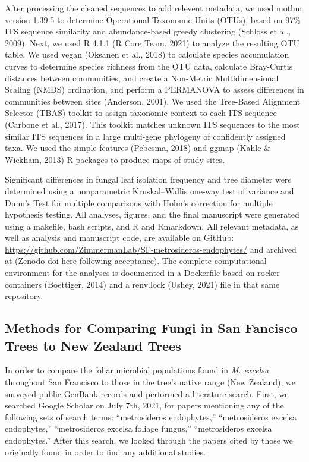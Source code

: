 \documentclass[fleqn,10pt,lineno]{wlpeerj} %
\begin{document}
After processing the cleaned sequences to add relevent metadata, we used mothur version 1.39.5 to determine Operational Taxonomic Units (OTUs), based on 97\% ITS sequence similarity and abundance-based greedy clustering (Schloss et al., 2009). Next, we used R 4.1.1 (R Core Team, 2021) to analyze the resulting OTU table. We used vegan (Oksanen et al., 2018) to calculate species accumulation curves to determine species richness from the OTU data, calculate Bray-Curtis distances between communities, and create a Non-Metric Multidimensional Scaling (NMDS) ordination, and perform a PERMANOVA to assess differences in communities between sites (Anderson, 2001). We used the Tree-Based Alignment Selector (TBAS) toolkit to assign taxonomic context to each ITS sequence (Carbone et al., 2017). This toolkit matches unknown ITS sequences to the most similar ITS sequences in a large multi-gene phylogeny of confidently assigned taxa. We used the simple features (Pebesma, 2018) and ggmap (Kahle \& Wickham, 2013) R packages to produce maps of study sites.

Significant differences in fungal leaf isolation frequency and tree diameter were determined using a nonparametric Kruskal--Wallis one-way test of variance and Dunn's Test for multiple comparisons with Holm's correction for multiple hypothesis testing. All analyses, figures, and the final manuscript were generated using a makefile, bash scripts, and R and Rmarkdown. All relevant metadata, as well as analysis and manuscript code, are available on GitHub: \url{https://github.com/ZimmermanLab/SF-metrosideros-endophytes/} and archived at (Zenodo doi here following acceptance). The complete computational environment for the analyses is documented in a Dockerfile based on rocker containers (Boettiger, 2014) and a renv.lock (Ushey, 2021) file in that same repository.

\hypertarget{methods-for-comparing-fungi-in-san-fancisco-trees-to-new-zealand-trees}{%
\subsection*{Methods for Comparing Fungi in San Fancisco Trees to New Zealand Trees}\label{methods-for-comparing-fungi-in-san-fancisco-trees-to-new-zealand-trees}}

In order to compare the foliar microbial populations found in \emph{M. excelsa} throughout San Francisco to those in the tree's native range (New Zealand), we surveyed public GenBank records and performed a literature search. First, we searched Google Scholar on July 7th, 2021, for papers mentioning any of the following sets of search terms: ``metrosideros endophytes,'' ``metrosideros excelsa endophytes,'' ``metrosideros excelsa foliage fungus,'' ``metrosideros excelsa endophytes.'' After this search, we looked through the papers cited by those we originally found in order to find any additional studies.
\end{document}
